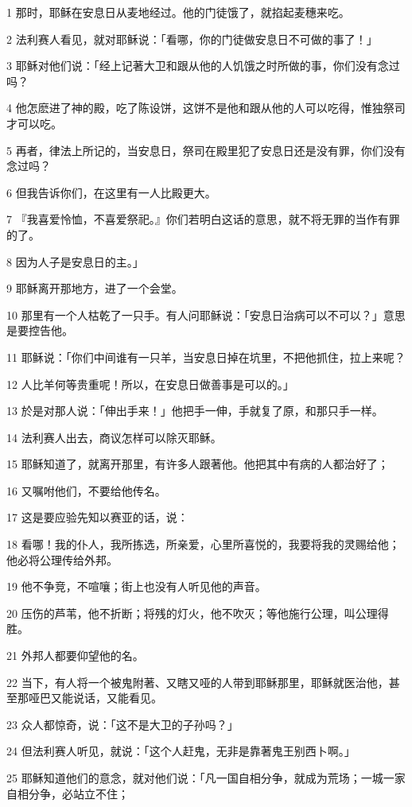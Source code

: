 \par 1 那时，耶稣在安息日从麦地经过。他的门徒饿了，就掐起麦穗来吃。
\par 2 法利赛人看见，就对耶稣说：「看哪，你的门徒做安息日不可做的事了！」
\par 3 耶稣对他们说：「经上记著大卫和跟从他的人饥饿之时所做的事，你们没有念过吗？
\par 4 他怎麽进了神的殿，吃了陈设饼，这饼不是他和跟从他的人可以吃得，惟独祭司才可以吃。
\par 5 再者，律法上所记的，当安息日，祭司在殿里犯了安息日还是没有罪，你们没有念过吗？
\par 6 但我告诉你们，在这里有一人比殿更大。
\par 7 『我喜爱怜恤，不喜爱祭祀。』你们若明白这话的意思，就不将无罪的当作有罪的了。
\par 8 因为人子是安息日的主。」
\par 9 耶稣离开那地方，进了一个会堂。
\par 10 那里有一个人枯乾了一只手。有人问耶稣说：「安息日治病可以不可以？」意思是要控告他。
\par 11 耶稣说：「你们中间谁有一只羊，当安息日掉在坑里，不把他抓住，拉上来呢？
\par 12 人比羊何等贵重呢！所以，在安息日做善事是可以的。」
\par 13 於是对那人说：「伸出手来！」他把手一伸，手就复了原，和那只手一样。
\par 14 法利赛人出去，商议怎样可以除灭耶稣。
\par 15 耶稣知道了，就离开那里，有许多人跟著他。他把其中有病的人都治好了；
\par 16 又嘱咐他们，不要给他传名。
\par 17 这是要应验先知以赛亚的话，说：
\par 18 看哪！我的仆人，我所拣选，所亲爱，心里所喜悦的，我要将我的灵赐给他；他必将公理传给外邦。
\par 19 他不争竞，不喧嚷；街上也没有人听见他的声音。
\par 20 压伤的芦苇，他不折断；将残的灯火，他不吹灭；等他施行公理，叫公理得胜。
\par 21 外邦人都要仰望他的名。
\par 22 当下，有人将一个被鬼附著、又瞎又哑的人带到耶稣那里，耶稣就医治他，甚至那哑巴又能说话，又能看见。
\par 23 众人都惊奇，说：「这不是大卫的子孙吗？」
\par 24 但法利赛人听见，就说：「这个人赶鬼，无非是靠著鬼王别西卜啊。」
\par 25 耶稣知道他们的意念，就对他们说：「凡一国自相分争，就成为荒场；一城一家自相分争，必站立不住；
